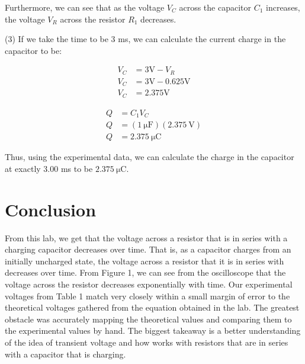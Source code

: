 \documentclass[12pt]{article}
\begin{document}
Furthermore, we can see that as the voltage $V_C$ across the capacitor $C_1$ increases, the voltage $V_R$ across the resistor $R_1$ decreases.

(3) If we take the time to be 3 ms, we can calculate the current charge in the capacitor to be:

\begin{equation*}
    \begin{split}
        V_C &= 3\text{V} - V_R \\
        V_C &= 3\text{V} - 0.625\text{V} \\
        V_C &= 2.375\text{V}
    \end{split}
\end{equation*}

\begin{equation*}
    \begin{split}
        Q &= C_1V_C \\
        Q &= (\SI{1}{\micro\farad})(\SI{2.375}{\volt}) \\
        Q &= \SI{2.375}{\micro\coulomb}
    \end{split}
\end{equation*}

Thus, using the experimental data, we can calculate the charge in the capacitor at exactly 3.00 ms to be $\SI{2.375}{\micro\coulomb}$.

\section{Conclusion}
From this lab, we get that the voltage across a resistor that is in series with a charging capacitor decreases over time. That is, as a capacitor charges from an initially uncharged state, the voltage across a resistor that it is in series with decreases over time. From Figure 1, we can see from the oscilloscope that the voltage across the resistor decreases exponentially with time. Our experimental voltages from Table 1 match very closely within a small margin of error to the theoretical voltages gathered from the equation obtained in the lab. The greatest obstacle was accurately mapping the theoretical values and comparing them to the experimental values by hand. The biggest takeaway is a better understanding of the idea of transient voltage and how works with resistors that are in series with a capacitor that is charging.
\end{document}
